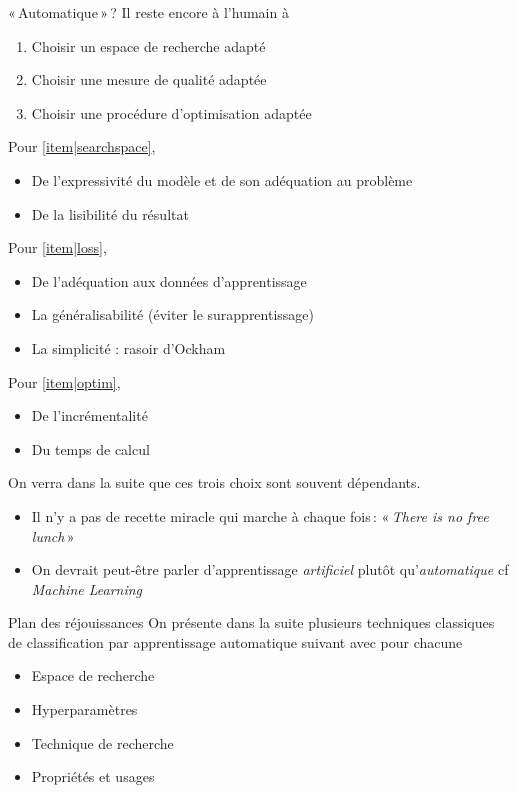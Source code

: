 \documentclass[hyperref={unicode}, xcolor={svgnames}, french]{beamer}
\begin{document}
\begin{frame}{« Automatique » ?}
    Il reste encore à l'humain à
    \begin{enumerate}[<alert@+>]
        \item\label{item|searchspace} Choisir un espace de recherche adapté
        \item\label{item|loss} Choisir une mesure de qualité adaptée
        \item\label{item|optim} Choisir une procédure d'optimisation adaptée
    \end{enumerate}

    \begin{overprint}
        Pour \ref{item|searchspace},
        \begin{itemize}
            \item De l'expressivité du modèle et de son adéquation au problème
            \item De la lisibilité du résultat
        \end{itemize}
        Pour \ref{item|loss},
        \begin{itemize}
            \item De l'adéquation aux données d'apprentissage
            \item La généralisabilité (éviter le surapprentissage)
            \item La simplicité : rasoir d'Ockham
        \end{itemize}
        Pour \ref{item|optim},
        \begin{itemize}
            \item De l'incrémentalité
            \item Du temps de calcul
        \end{itemize}
        On verra dans la suite que ces trois choix sont souvent dépendants.
        \begin{itemize}
            \item Il n'y a pas de recette miracle qui marche à chaque fois : « \emph{There is no free lunch} »
            \item On devrait peut-être parler d'apprentissage \emph{artificiel} plutôt qu'\emph{automatique} cf \emph{Machine Learning}
        \end{itemize}
    \end{overprint}
\end{frame}

\begin{frame}{Plan des réjouissances}
    On présente dans la suite plusieurs techniques classiques de classification par apprentissage automatique suivant avec pour chacune
    \begin{itemize}
        \item Espace de recherche
        \item Hyperparamètres
        \item Technique de recherche
        \item Propriétés et usages
    \end{itemize}
\end{frame}
\end{document}
